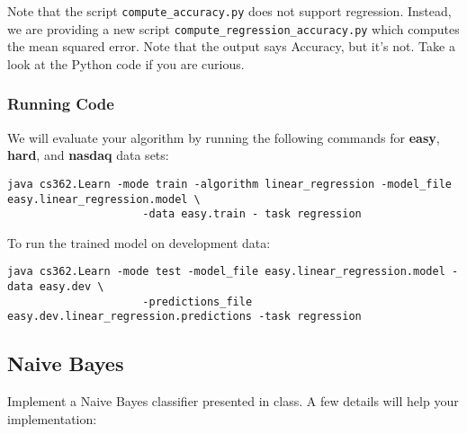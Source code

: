\documentclass[11pt]{article}
\newcommand{\code}[1]{{\footnotesize \tt #1}}
\begin{document}
Note that the script \code{compute\_accuracy.py} does not support regression. 
Instead, we are providing a new script
\code{compute\_regression\_accuracy.py} which computes the mean
squared error. Note that the output says Accuracy, but it's not. Take
a look at the Python code if you are curious.

\subsubsection{Running Code}
We will evaluate your algorithm by running the following commands for
{\bf easy}, {\bf hard}, and {\bf nasdaq} data sets:
\begin{footnotesize}
\begin{verbatim}
java cs362.Learn -mode train -algorithm linear_regression -model_file easy.linear_regression.model \
                     -data easy.train - task regression
\end{verbatim}
\end{footnotesize}
To run the trained model on development data:
\begin{footnotesize}
\begin{verbatim}
java cs362.Learn -mode test -model_file easy.linear_regression.model -data easy.dev \
                     -predictions_file easy.dev.linear_regression.predictions -task regression
\end{verbatim}
\end{footnotesize}

\subsection{Naive Bayes}
Implement a Naive Bayes classifier presented in class. A few details will help your
implementation:

\end{document}

